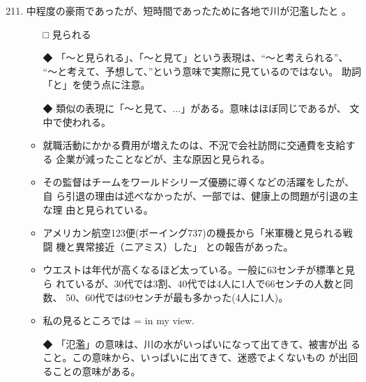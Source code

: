\documentclass[
uplatex,
b5paper,
10pt,
dvipdfmx
]{jsbook}
\begin{document}
\begin{enumerate}
\setcounter{enumi}{210}
\setcounter{footnote}{0}


\item 中程度の豪雨であったが、短時間であったために各地で川が氾濫したと
      \underline{   }。

\begin{itemize}
\item[□] 見られる
\item[◆] 「〜と見られる」、「〜と見て」という表現は、``〜と考えられる''、
	  ``〜と考えて、予想して、''という意味で実際に見ているのではない。
	  助詞「と」を使う点に注意。
\item[◆] 類似の表現に「〜と見て、...」がある。意味はほぼ同じであるが、
	  文中で使われる。
\end{itemize}

\begin{itemize}
\item 就職活動にかかる費用が増えたのは、不況で会社訪問に交通費を支給する
      企業が減ったことなどが、主な原因と見られる。
\item その監督はチームをワールドシリーズ優勝に導くなどの活躍をしたが、自
      ら引退の理由は述べなかったが、一部では、健康上の問題が引退の主な理
      由と見られている。
\item アメリカン航空123便(ボーイング737)の機長から「米軍機と見られる戦闘
      機と異常接近（ニアミス）した」 との報告があった。
\item ウエストは年代が高くなるほど太っている。一般に63センチが標準と見ら
      れているが、30代では3割、40代では4人に1人で66センチの人数と同数、
      50、60代では69センチが最も多かった(4人に1人)。
\item 私の見るところでは = in my view.
\end{itemize}


\begin{itemize}
 \item[◆] 「氾濫」の意味は、川の水がいっぱいになって出てきて、被害が出
	    ること。この意味から、いっぱいに出てきて、迷惑でよくないもの
	    が出回ることの意味がある。
\end{itemize}


\end{enumerate}
\end{document}
